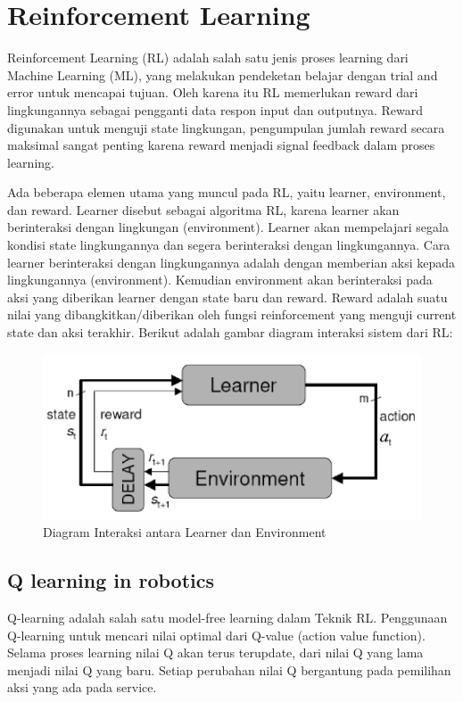 

\section{Reinforcement Learning}
Reinforcement Learning (RL) adalah salah satu jenis proses learning dari Machine Learning (ML), yang melakukan pendeketan belajar dengan trial and error untuk mencapai tujuan. Oleh karena itu RL memerlukan reward dari lingkungannya sebagai pengganti data respon input dan outputnya. Reward digunakan untuk menguji state lingkungan, pengumpulan jumlah reward secara maksimal sangat penting karena reward menjadi signal feedback dalam proses learning.

Ada beberapa elemen utama yang muncul pada RL, yaitu learner, environment, dan reward. Learner disebut sebagai algoritma RL, karena learner akan berinteraksi dengan lingkungan (environment). Learner akan mempelajari segala kondisi state lingkungannya dan segera berinteraksi dengan lingkungannya. Cara learner berinteraksi dengan lingkungannya adalah dengan memberian aksi kepada lingkungannya (environment). Kemudian environment akan berinteraksi pada aksi yang diberikan learner dengan state baru dan reward. Reward adalah suatu nilai yang dibangkitkan/diberikan oleh fungsi reinforcement yang menguji current state dan aksi terakhir. Berikut adalah gambar diagram interaksi sistem dari RL:

\begin{figure}[H]
	\centering
	\includegraphics[width=0.7\linewidth]{"figure/screenshot013"}
	\caption{Diagram Interaksi antara Learner dan Environment}
	\label{fig:screenshot013}
\end{figure}

\subsection{Q learning in robotics}
Q-learning adalah salah satu model-free learning dalam Teknik RL. Penggunaan Q-learning untuk mencari nilai optimal dari Q-value (action value function). Selama proses learning nilai Q akan terus terupdate, dari nilai Q yang lama menjadi nilai Q yang baru. Setiap perubahan nilai Q bergantung pada pemilihan aksi yang ada pada service.

